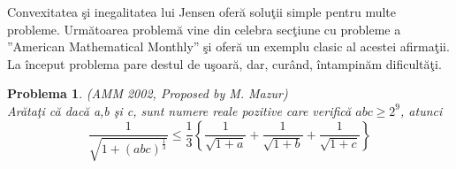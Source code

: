 \documentclass[a4paper,12pt,oneside]{report}
\newtheorem{problem}{Problema}
\begin{document}
Convexitatea \c{s}i inegalitatea lui Jensen ofer\u{a} solu\c{t}ii simple pentru multe probleme.
  Urm\u{a}toarea problem\u{a} vine din celebra sec\c{t}iune cu probleme a ”American Mathematical Monthly” \c{s}i ofer\u{a} un exemplu clasic al acestei afirma\c{t}ii.
  La \^{i}nceput problema pare destul de u\c{s}oar\u{a}, dar, cur\^{a}nd, \^{i}ntampin\u{a}m dificult\u{a}\c{t}i.

\begin{problem}(AMM 2002, Proposed by M. Mazur)\\
Ar\u{a}ta\c{t}i c\u{a} dac\u{a} a,b \c{s}i c, sunt numere reale pozitive care verific\u{a} \(abc \geq 2^{9}\), atunci
\begin{displaymath}
  \frac{1}{\sqrt{1 + \left ( abc \right )^{\frac{1}{3}}}}\leq \frac{1}{3}\left \{ \frac{1}{\sqrt{1 + a}} + \frac{1}{\sqrt{1 + b}} + \frac{1}{\sqrt{1 + c}}\right \}
  \label{eq:2.7} \tag{2.7}
\end{displaymath}
\end{problem}
\end{document}
